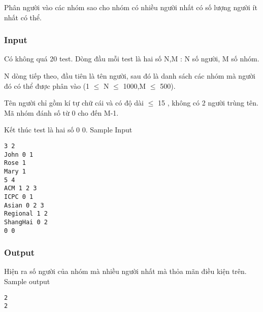



   Phân người vào các nhóm sao cho nhóm có nhiều người nhất có số lượng người ít nhất có thể.  

\subsubsection{   Input  }

   Có không quá 20 test. Dòng đầu mỗi test là hai số N,M : N số người, M số nhóm.  

   N dòng tiếp theo, đầu tiên là tên người, sau đó là danh sách các nhóm mà người đó có thể được phân vào (1 $\le$ N $\le$ 1000,M $\le$ 500).  

   Tên người chỉ gồm kí tự chữ cái và có độ dài   $\le$ 15 , không có 2 người trùng tên. Mã nhóm đánh số từ 0 cho đến M-1.  

   Kết thúc test là hai số 0 0.       Sample Input    
\begin{verbatim}
3 2 
John 0 1 
Rose 1 
Mary 1 
5 4 
ACM 1 2 3 
ICPC 0 1  
Asian 0 2 3 
Regional 1 2 
ShangHai 0 2 
0 0 
\end{verbatim}

\subsubsection{   Output  }

   Hiện ra số người của nhóm mà nhiều người nhất mà thỏa mãn điều kiện trên.       Sample output    
\begin{verbatim}
2
2
\end{verbatim}

